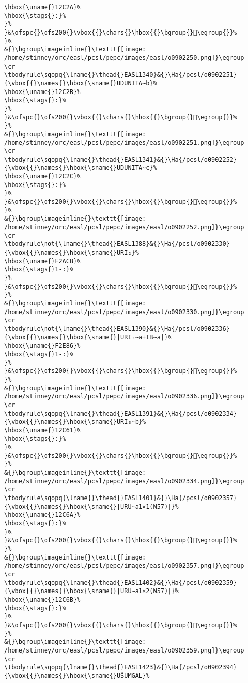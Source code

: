 \begin{verbatim}
\hbox{\uname{}12C2A}%
\hbox{\stags{}:}%
}%
}&\ofspc{}\ofs200{}\vbox{{}\chars{}\hbox{{}\bgroup{}𒰪\egroup{}}%
}%
&{}\bgroup\imageinline{}\texttt{[image: /home/stinney/orc/easl/pcsl/pepc/images/easl/o0902250.png]}\egroup
\cr
\tbodyrule\sqopq{\lname{}\thead{}EASL1340}&{}\Ha{/pcsl/o0902251}{\vbox{{}\names{}\hbox{\sname{}UDUNITA∼b}%
\hbox{\uname{}12C2B}%
\hbox{\stags{}:}%
}%
}&\ofspc{}\ofs200{}\vbox{{}\chars{}\hbox{{}\bgroup{}𒰫\egroup{}}%
}%
&{}\bgroup\imageinline{}\texttt{[image: /home/stinney/orc/easl/pcsl/pepc/images/easl/o0902251.png]}\egroup
\cr
\tbodyrule\sqopq{\lname{}\thead{}EASL1341}&{}\Ha{/pcsl/o0902252}{\vbox{{}\names{}\hbox{\sname{}UDUNITA∼c}%
\hbox{\uname{}12C2C}%
\hbox{\stags{}:}%
}%
}&\ofspc{}\ofs200{}\vbox{{}\chars{}\hbox{{}\bgroup{}𒰬\egroup{}}%
}%
&{}\bgroup\imageinline{}\texttt{[image: /home/stinney/orc/easl/pcsl/pepc/images/easl/o0902252.png]}\egroup
\cr
\tbodyrule\not{\lname{}\thead{}EASL1388}&{}\Ha{/pcsl/o0902330}{\vbox{{}\names{}\hbox{\sname{}URI₂}%
\hbox{\uname{}F2ACB}%
\hbox{\stags{}1-:}%
}%
}&\ofspc{}\ofs200{}\vbox{{}\chars{}\hbox{{}\bgroup{}󲫋\egroup{}}%
}%
&{}\bgroup\imageinline{}\texttt{[image: /home/stinney/orc/easl/pcsl/pepc/images/easl/o0902330.png]}\egroup
\cr
\tbodyrule\not{\lname{}\thead{}EASL1390}&{}\Ha{/pcsl/o0902336}{\vbox{{}\names{}\hbox{\sname{}|URI₃∼a+IB∼a|}%
\hbox{\uname{}F2E86}%
\hbox{\stags{}1-:}%
}%
}&\ofspc{}\ofs200{}\vbox{{}\chars{}\hbox{{}\bgroup{}󲺆\egroup{}}%
}%
&{}\bgroup\imageinline{}\texttt{[image: /home/stinney/orc/easl/pcsl/pepc/images/easl/o0902336.png]}\egroup
\cr
\tbodyrule\sqopq{\lname{}\thead{}EASL1391}&{}\Ha{/pcsl/o0902334}{\vbox{{}\names{}\hbox{\sname{}URI₃∼b}%
\hbox{\uname{}12C61}%
\hbox{\stags{}:}%
}%
}&\ofspc{}\ofs200{}\vbox{{}\chars{}\hbox{{}\bgroup{}𒱡\egroup{}}%
}%
&{}\bgroup\imageinline{}\texttt{[image: /home/stinney/orc/easl/pcsl/pepc/images/easl/o0902334.png]}\egroup
\cr
\tbodyrule\sqopq{\lname{}\thead{}EASL1401}&{}\Ha{/pcsl/o0902357}{\vbox{{}\names{}\hbox{\sname{}|URU∼a1×1(N57)|}%
\hbox{\uname{}12C6A}%
\hbox{\stags{}:}%
}%
}&\ofspc{}\ofs200{}\vbox{{}\chars{}\hbox{{}\bgroup{}𒱪\egroup{}}%
}%
&{}\bgroup\imageinline{}\texttt{[image: /home/stinney/orc/easl/pcsl/pepc/images/easl/o0902357.png]}\egroup
\cr
\tbodyrule\sqopq{\lname{}\thead{}EASL1402}&{}\Ha{/pcsl/o0902359}{\vbox{{}\names{}\hbox{\sname{}|URU∼a1×2(N57)|}%
\hbox{\uname{}12C6B}%
\hbox{\stags{}:}%
}%
}&\ofspc{}\ofs200{}\vbox{{}\chars{}\hbox{{}\bgroup{}𒱫\egroup{}}%
}%
&{}\bgroup\imageinline{}\texttt{[image: /home/stinney/orc/easl/pcsl/pepc/images/easl/o0902359.png]}\egroup
\cr
\tbodyrule\sqopq{\lname{}\thead{}EASL1423}&{}\Ha{/pcsl/o0902394}{\vbox{{}\names{}\hbox{\sname{}UŠUMGAL}%

\end{verbatim}
